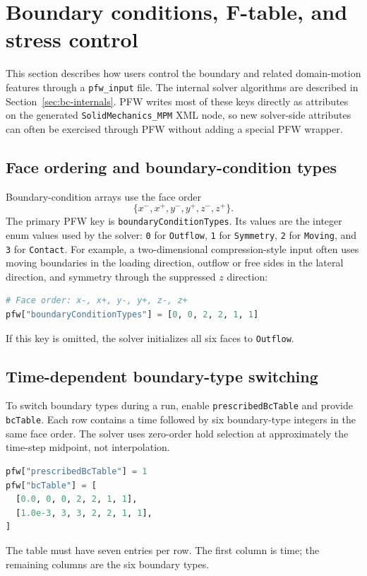 \section{Boundary conditions, F-table, and stress control}
\label{sec:pfw-boundary-controls}

This section describes how users control the boundary and related domain-motion features through a \texttt{pfw\_input} file.  The internal solver algorithms are described in Section~\ref{sec:bc-internals}.  PFW writes most of these keys directly as attributes on the generated \texttt{SolidMechanics\_MPM} XML node, so new solver-side attributes can often be exercised through PFW without adding a special PFW wrapper.

\subsection{Face ordering and boundary-condition types}

Boundary-condition arrays use the face order
\begin{equation}
  \{x^-,x^+,y^-,y^+,z^-,z^+\}.
\end{equation}
The primary PFW key is \texttt{boundaryConditionTypes}.  Its values are the integer enum values used by the solver: \texttt{0} for \texttt{Outflow}, \texttt{1} for \texttt{Symmetry}, \texttt{2} for \texttt{Moving}, and \texttt{3} for \texttt{Contact}.  For example, a two-dimensional compression-style input often uses moving boundaries in the loading direction, outflow or free sides in the lateral direction, and symmetry through the suppressed $z$ direction:
\begin{lstlisting}[language=Python,caption={PFW boundary face order and type selection.}]
# Face order: x-, x+, y-, y+, z-, z+
pfw["boundaryConditionTypes"] = [0, 0, 2, 2, 1, 1]
\end{lstlisting}
If this key is omitted, the solver initializes all six faces to \texttt{Outflow}.

\subsection{Time-dependent boundary-type switching}

To switch boundary types during a run, enable \texttt{prescribedBcTable} and provide \texttt{bcTable}.  Each row contains a time followed by six boundary-type integers in the same face order.  The solver uses zero-order hold selection at approximately the time-step midpoint, not interpolation.
\begin{lstlisting}[language=Python,caption={PFW boundary-condition table.}]
pfw["prescribedBcTable"] = 1
pfw["bcTable"] = [
  [0.0, 0, 0, 2, 2, 1, 1],
  [1.0e-3, 3, 3, 2, 2, 1, 1],
]
\end{lstlisting}
The table must have seven entries per row.  The first column is time; the remaining columns are the six boundary types.

